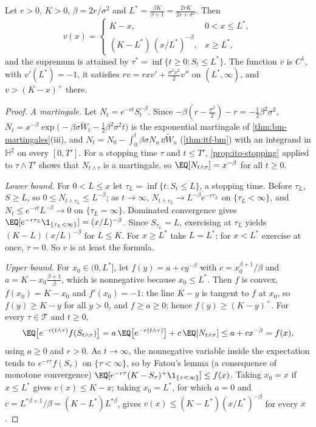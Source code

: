 \begin{proposition}\label{prop:exo-perpetual-put}
Let $r>0$, $K>0$, $\beta=2r/\sigma^2$ and $L^*=\frac{\beta K}{\beta+1}=\frac{2rK}{2r+\sigma^2}$. Then
\[
  v(x)=\begin{cases}K-x,&0<x\le L^*,\\[2pt](K-L^*)\,(x/L^*)^{-\beta},&x\ge L^*,\end{cases}
\]
and the supremum is attained by $\tau^*=\inf\{t\ge0:S_t\le L^*\}$. The function $v$ is $C^1$, with
$v'(L^*)=-1$, it satisfies $rv=rxv'+\frac{\sigma^2x^2}2v''$ on $(L^*,\infty)$, and $v>(K-x)^+$ there.
\end{proposition}

\begin{proof}
\emph{A martingale.} Let $N_t=e^{-rt}S_t^{-\beta}$. Since
$-\beta(r-\frac{\sigma^2}2)-r=-\frac12\beta^2\sigma^2$, $N_t=x^{-\beta}\exp\big(-\beta\sigma\widetilde
W_t-\frac12\beta^2\sigma^2t\big)$ is the exponential martingale of \cref{thm:bm-martingales}(iii),
and $N_t=N_0-\int_0^t\beta\sigma N_u\,\dd\widetilde W_u$ (\cref{thm:itf-bm}) with an integrand in
$\mathbb H^2$ on every $[0,T']$. For a stopping time $\tau$ and $t\le T'$, \cref{prop:ito-stopping}
applied to $\tau\wedge T'$ shows that $N_{t\wedge\tau}$ is a martingale, so
$\EQ[N_{t\wedge\tau}]=x^{-\beta}$ for all $t\ge0$.

\emph{Lower bound.} For $0<L\le x$ let $\tau_L=\inf\{t:S_t\le L\}$, a stopping time. Before
$\tau_L$, $S\ge L$, so $0\le N_{t\wedge\tau_L}\le L^{-\beta}$; as $t\to\infty$,
$N_{t\wedge\tau_L}\to L^{-\beta}e^{-r\tau_L}$ on $\{\tau_L<\infty\}$, and $N_t\le e^{-rt}L^{-\beta}\to0$
on $\{\tau_L=\infty\}$. Dominated convergence gives $\EQ[e^{-r\tau_L}\1_{\{\tau_L<\infty\}}]=(x/L)^{-\beta}$.
Since $S_{\tau_L}=L$, exercising at $\tau_L$ yields $(K-L)(x/L)^{-\beta}$ for $L\le K$. For
$x\ge L^*$ take $L=L^*$; for $x<L^*$ exercise at once, $\tau=0$. So $v$ is at least the formula.

\emph{Upper bound.} For $x_0\in(0,L^*]$, let $f(y)=a+cy^{-\beta}$ with $c=x_0^{\beta+1}/\beta$
and $a=K-x_0\frac{\beta+1}\beta$, which is nonnegative because $x_0\le L^*$. Then $f$ is convex,
$f(x_0)=K-x_0$ and $f'(x_0)=-1$: the line $K-y$ is tangent to $f$ at $x_0$, so $f(y)\ge K-y$ for
all $y>0$, and $f\ge a\ge0$; hence $f(y)\ge(K-y)^+$. For every $\tau\in\mathcal T$ and $t\ge0$,
\[
  \EQ\big[e^{-r(t\wedge\tau)}f(S_{t\wedge\tau})\big]=a\,\EQ\big[e^{-r(t\wedge\tau)}\big]+c\,\EQ[N_{t\wedge\tau}]
  \le a+cx^{-\beta}=f(x),
\]
using $a\ge0$ and $r>0$. As $t\to\infty$, the nonnegative variable inside the expectation tends
to $e^{-r\tau}f(S_\tau)$ on $\{\tau<\infty\}$, so by Fatou's lemma (a consequence of monotone
convergence) $\EQ[e^{-r\tau}(K-S_\tau)^+\1_{\{\tau<\infty\}}]\le f(x)$. Taking $x_0=x$ if $x\le L^*$ gives
$v(x)\le K-x$; taking $x_0=L^*$, for which $a=0$ and $c=L^{*\beta+1}/\beta=(K-L^*)L^{*\beta}$, gives
$v(x)\le(K-L^*)(x/L^*)^{-\beta}$ for every $x$.


\end{proof}
